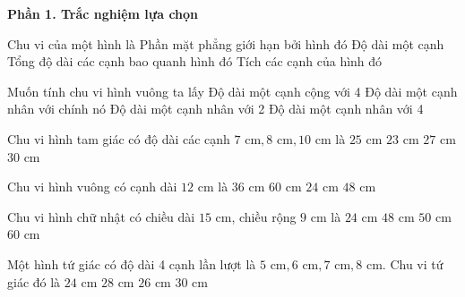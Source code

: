 \textbf{Phần 1. Trắc nghiệm lựa chọn}

\begin{ex} %
Chu vi của một hình là
\choice
{Phần mặt phẳng giới hạn bởi hình đó}
{Độ dài một cạnh}
{\True Tổng độ dài các cạnh bao quanh hình đó}
{Tích các cạnh của hình đó}
\end{ex}

\begin{ex} %
Muốn tính chu vi hình vuông ta lấy
\choice
{Độ dài một cạnh cộng với 4}
{Độ dài một cạnh nhân với chính nó}
{Độ dài một cạnh nhân với 2}
{\True Độ dài một cạnh nhân với 4}
\end{ex}

\begin{ex} %
Chu vi hình tam giác có độ dài các cạnh $7\text{ cm}, 8\text{ cm}, 10\text{ cm}$ là
\choice
{\True $25\text{ cm}$}
{$23\text{ cm}$}
{$27\text{ cm}$}
{$30\text{ cm}$}
\end{ex}

\begin{ex} %
Chu vi hình vuông có cạnh dài $12\text{ cm}$ là
\choice
{$36\text{ cm}$}
{$60\text{ cm}$}
{$24\text{ cm}$}
{\True $48\text{ cm}$}
\end{ex}

\begin{ex} %
Chu vi hình chữ nhật có chiều dài $15\text{ cm}$, chiều rộng $9\text{ cm}$ là
\choice
{$24\text{ cm}$}
{\True $48\text{ cm}$}
{$50\text{ cm}$}
{$60\text{ cm}$}
\end{ex}

\begin{ex} %
Một hình tứ giác có độ dài 4 cạnh lần lượt là $5\text{ cm}, 6\text{ cm}, 7\text{ cm}, 8\text{ cm}$. Chu vi tứ giác đó là
\choice
{$24\text{ cm}$}
{$28\text{ cm}$}
{\True $26\text{ cm}$}
{$30\text{ cm}$}
\end{ex}

